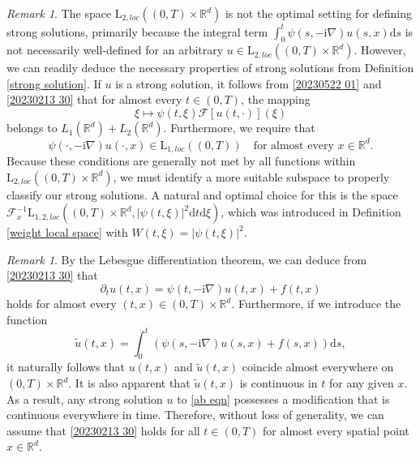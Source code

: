 \documentclass[11pt,reqno]{amsart}
\theoremstyle{definition}
\theoremstyle{remark}
\newtheorem{rem}[thm]{Remark}
\numberwithin{equation}{section}
\begin{document}
\begin{rem}
The space $\mathrm{L}_{2,loc}((0,T) \times \mathbb{R}^d)$ is not the optimal setting for defining strong solutions, primarily because the integral term $\int_0^t \psi(s,-\mathrm{i}\nabla)u(s,x) \mathrm{d}s$ is not necessarily well-defined for an arbitrary $u \in \mathrm{L}_{2,loc}((0,T) \times \mathbb{R}^d)$. 
However, we can readily deduce the necessary properties of strong solutions from Definition \ref{strong solution}. 
If $u$ is a strong solution, it follows from \eqref{20230522 01} and \eqref{20230213 30} that for almost every $t \in (0,T)$, the mapping
$$
\xi \mapsto \psi(t,\xi)\mathcal{F}[u(t,\cdot)](\xi)
$$
belongs to $L_1(\mathbb{R}^d) + L_2(\mathbb{R}^d)$. 
Furthermore, we require that
$$
\psi(\cdot,-\mathrm{i}\nabla)u(\cdot,x) \in \mathrm{L}_{1,loc}\left((0,T)\right) \quad \text{for almost every } x \in \mathbb{R}^d.
$$
Because these conditions are generally not met by all functions within $\mathrm{L}_{2,loc}((0,T) \times \mathbb{R}^d)$, we must identify a more suitable subspace to properly classify our strong solutions. 
A natural and optimal choice for this is the space $\mathcal{F}_x^{-1}\mathrm{L}_{1,2,loc}\left( (0,T) \times \mathbb{R}^d, |\psi(t,\xi)|^2 \mathrm{d}t \mathrm{d}\xi \right)$, which was introduced in Definition \ref{weight local space} with $W(t,\xi) =|\psi(t,\xi)|^2$. 
\end{rem}

\begin{rem}
									\label{continuous modification}
By the Lebesgue differentiation theorem, 
we can deduce from \eqref{20230213 30} that
$$
\partial_t u(t,x) = \psi(t,-\mathrm{i}\nabla)u(t,x) + f(t,x) 
$$ 
holds for almost every $(t,x) \in (0,T) \times \mathbb{R}^d$.
Furthermore, if we introduce the function
$$\tilde{u}(t,x) = \int_0^t \left( \psi(s,-\mathrm{i}\nabla)u(s,x) + f(s,x) \right) \mathrm{d}s,
$$
it naturally follows that $u(t,x)$ and $\tilde{u}(t,x)$ coincide almost everywhere on $(0,T) \times \mathbb{R}^d$. 
It is also apparent that $\tilde{u}(t,x)$ is continuous in $t$ for any given $x$. 
As a result, any strong solution $u$ to \eqref{ab eqn} possesses a modification that is continuous everywhere in time. Therefore, without loss of generality, we can assume that \eqref{20230213 30} holds for all $t \in (0,T)$ for almost every spatial point $x \in \mathbb{R}^d$.



\end{rem}
\end{document}
